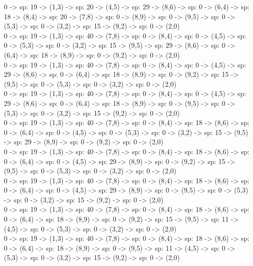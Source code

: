 \documentclass[10pt,a4paper]{article}
\begin{document}
0 -> sp: 19 -> (1,3) -> sp: 20 -> (4,5) -> sp: 29 -> (8,6) -> sp: 0 -> (6,4) -> sp: 18 -> (8,4) -> sp: 20 -> (7,8) -> sp: 0 -> (8,9) -> sp: 0 -> (9,5) -> sp: 0 -> (5,3) -> sp: 0 -> (3,2) -> sp: 15 -> (9,2) -> sp: 0 -> (2,0)\\

0 -> sp: 19 -> (1,3) -> sp: 40 -> (7,8) -> sp: 0 -> (8,4) -> sp: 0 -> (4,5) -> sp: 0 -> (5,3) -> sp: 0 -> (3,2) -> sp: 15 -> (9,5) -> sp: 29 -> (8,6) -> sp: 0 -> (6,4) -> sp: 18 -> (8,9) -> sp: 0 -> (9,2) -> sp: 0 -> (2,0)\\

0 -> sp: 19 -> (1,3) -> sp: 40 -> (7,8) -> sp: 0 -> (8,4) -> sp: 0 -> (4,5) -> sp: 29 -> (8,6) -> sp: 0 -> (6,4) -> sp: 18 -> (8,9) -> sp: 0 -> (9,2) -> sp: 15 -> (9,5) -> sp: 0 -> (5,3) -> sp: 0 -> (3,2) -> sp: 0 -> (2,0)\\

0 -> sp: 19 -> (1,3) -> sp: 40 -> (7,8) -> sp: 0 -> (8,4) -> sp: 0 -> (4,5) -> sp: 29 -> (8,6) -> sp: 0 -> (6,4) -> sp: 18 -> (8,9) -> sp: 0 -> (9,5) -> sp: 0 -> (5,3) -> sp: 0 -> (3,2) -> sp: 15 -> (9,2) -> sp: 0 -> (2,0)\\

0 -> sp: 19 -> (1,3) -> sp: 40 -> (7,8) -> sp: 0 -> (8,4) -> sp: 18 -> (8,6) -> sp: 0 -> (6,4) -> sp: 0 -> (4,5) -> sp: 0 -> (5,3) -> sp: 0 -> (3,2) -> sp: 15 -> (9,5) -> sp: 29 -> (8,9) -> sp: 0 -> (9,2) -> sp: 0 -> (2,0)\\

0 -> sp: 19 -> (1,3) -> sp: 40 -> (7,8) -> sp: 0 -> (8,4) -> sp: 18 -> (8,6) -> sp: 0 -> (6,4) -> sp: 0 -> (4,5) -> sp: 29 -> (8,9) -> sp: 0 -> (9,2) -> sp: 15 -> (9,5) -> sp: 0 -> (5,3) -> sp: 0 -> (3,2) -> sp: 0 -> (2,0)\\

0 -> sp: 19 -> (1,3) -> sp: 40 -> (7,8) -> sp: 0 -> (8,4) -> sp: 18 -> (8,6) -> sp: 0 -> (6,4) -> sp: 0 -> (4,5) -> sp: 29 -> (8,9) -> sp: 0 -> (9,5) -> sp: 0 -> (5,3) -> sp: 0 -> (3,2) -> sp: 15 -> (9,2) -> sp: 0 -> (2,0)\\

0 -> sp: 19 -> (1,3) -> sp: 40 -> (7,8) -> sp: 0 -> (8,4) -> sp: 18 -> (8,6) -> sp: 0 -> (6,4) -> sp: 18 -> (8,9) -> sp: 0 -> (9,2) -> sp: 15 -> (9,5) -> sp: 11 -> (4,5) -> sp: 0 -> (5,3) -> sp: 0 -> (3,2) -> sp: 0 -> (2,0)\\

0 -> sp: 19 -> (1,3) -> sp: 40 -> (7,8) -> sp: 0 -> (8,4) -> sp: 18 -> (8,6) -> sp: 0 -> (6,4) -> sp: 18 -> (8,9) -> sp: 0 -> (9,5) -> sp: 11 -> (4,5) -> sp: 0 -> (5,3) -> sp: 0 -> (3,2) -> sp: 15 -> (9,2) -> sp: 0 -> (2,0)\\
\end{document}

